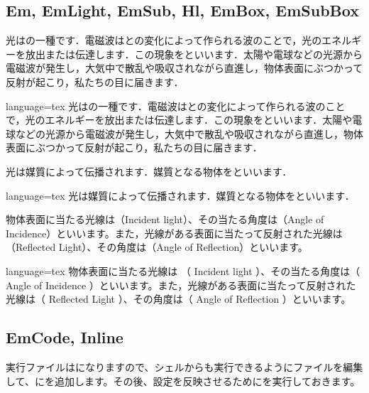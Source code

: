 \documentclass[../main]{subfiles}
\begin{document}
\subsection{Em, EmLight, EmSub, Hl, EmBox, EmSubBox}

光はの一種です．電磁波はとの変化によって作られる波のことで，光のエネルギーを放出または伝達します．この現象をといいます．太陽や電球などの光源から電磁波が発生し，大気中で散乱や吸収されながら直進し，物体表面にぶつかって反射が起こり，私たちの目に届きます．

\begin{Code}{language=tex}
光はの一種です．電磁波はとの変化によって作られる波のことで，光のエネルギーを放出または伝達します．この現象をといいます．太陽や電球などの光源から電磁波が発生し，大気中で散乱や吸収されながら直進し，物体表面にぶつかって反射が起こり，私たちの目に届きます．
\end{Code}

\HRuleLeader

光は媒質によって伝播されます．媒質となる物体をといいます．

\begin{Code}{language=tex}
光は媒質によって伝播されます．媒質となる物体をといいます．
\end{Code}

\HRuleLeader

物体表面に当たる光線は（Incident light）、その当たる角度は（Angle of Incidence）といいます。また，光線がある表面に当たって反射された光線は（Reflected Light）、その角度は（Angle of Reflection）といいます。

\begin{Code}{language=tex}
物体表面に当たる光線は （ Incident light ）、その当たる角度は（ Angle of Incidence ）といいます。また，光線がある表面に当たって反射された光線は（ Reflected Light ）、その角度は（ Angle of Reflection ）といいます。
\end{Code}

\subsection{EmCode, Inline}

実行ファイルはになりますので、シェルからも実行できるようにファイルを編集して、にを追加します。その後、設定を反映させるためにを実行しておきます。
\end{document}
